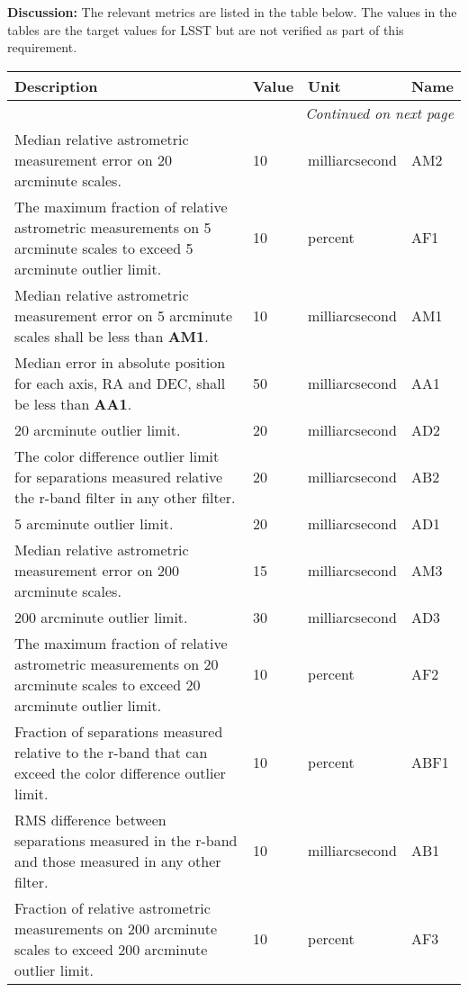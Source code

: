\documentclass[SE,toc,lsstdraft]{lsstdoc}
\makeatletter
\newcommand{\paramname}[1]{\hspace{0pt}#1}
\newcommand{\unitname}[1]{\hspace{0pt}#1}
\newenvironment{parameters}[0]{%
\setlength\LTleft{0pt}
\setlength\LTright{\fill}
\begin{small}
\begin{longtable}[]{|p{0.49\textwidth}|l|p{0.6in}|p{1.70in}@{}|}

\hline \textbf{Description} & \textbf{Value} & \textbf{Unit} & \textbf{Name} \\ \hline
\endhead

\hline \multicolumn{4}{r}{\emph{Continued on next page}} \\
\endfoot

\hline\hline
\endlastfoot
}{%
\hline
\end{longtable}
\end{small}
}
\makeatother
\begin{document}
\textbf{Discussion:}
The relevant metrics are listed in the table below. The values in the tables are the target values for LSST but are not verified as part of this requirement.

\begin{parameters}
Median relative astrometric measurement error on 20 arcminute scales.

&
10
&
\unitname{%
milliarcsecond
}
&
\paramname{%
AM2
} \\\hline
The maximum fraction of relative astrometric measurements on 5 arcminute scales to exceed 5 arcminute outlier limit.
&
10
&
\unitname{%
percent
}
&
\paramname{%
AF1
} \\\hline
Median relative astrometric measurement error on 5 arcminute scales shall be less than \textbf{AM1}.

&
10
&
\unitname{%
milliarcsecond
}
&
\paramname{%
AM1
} \\\hline
    Median error in absolute position for each axis, RA and DEC, shall be less than \textbf{AA1}.
&
50
&
\unitname{%
milliarcsecond
}
&
\paramname{%
AA1
} \\\hline
20 arcminute outlier limit.

&
20
&
\unitname{%
milliarcsecond
}
&
\paramname{%
AD2
} \\\hline
The color difference outlier limit for separations measured relative the r-band filter in any other filter.
&
20
&
\unitname{%
milliarcsecond
}
&
\paramname{%
AB2
} \\\hline
5 arcminute outlier limit.
&
20
&
\unitname{%
milliarcsecond
}
&
\paramname{%
AD1
} \\\hline
Median relative astrometric measurement error on 200 arcminute scales.

&
15
&
\unitname{%
milliarcsecond
}
&
\paramname{%
AM3
} \\\hline
200 arcminute outlier limit.

&
30
&
\unitname{%
milliarcsecond
}
&
\paramname{%
AD3
} \\\hline
The maximum fraction of relative astrometric measurements on 20 arcminute scales to exceed 20 arcminute outlier limit.
&
10
&
\unitname{%
percent
}
&
\paramname{%
AF2
} \\\hline
Fraction of separations measured relative to the r-band that can exceed the color difference outlier limit.

&
10
&
\unitname{%
percent
}
&
\paramname{%
ABF1
} \\\hline
RMS difference between separations measured in the r-band and those measured in any other filter.

&
10
&
\unitname{%
milliarcsecond
}
&
\paramname{%
AB1
} \\\hline
Fraction of relative astrometric measurements on 200 arcminute scales to exceed 200 arcminute outlier limit.
&
10
&
\unitname{%
percent
}
&
\paramname{%
AF3
} \\\hline
\end{parameters}
\end{document}

